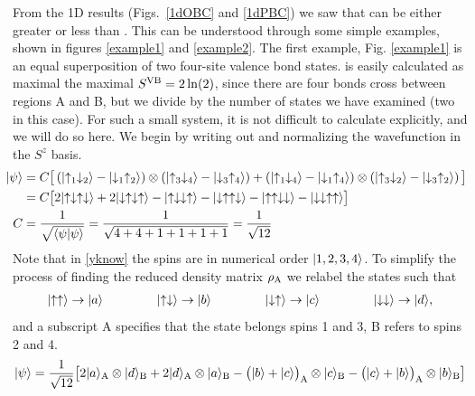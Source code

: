 From the 1D results (Figs.~\ref{1dOBC} and \ref{1dPBC}) we saw that \vb can be either greater or less than \vN.
This can be understood through some simple examples, shown in figures \ref{example1} and \ref{example2}.
The first example, Fig. \ref{example1} is an equal superposition of two four-site valence bond states. 
 \vb is easily calculated as maximal the maximal $S^{\text{VB}} = 2\ln(2)$, since there are four bonds cross between regions A and B, but we divide by the number of states we have examined (two in this case).
 For such a small system, it is not difficult to calculate \vn explicitly, and we will do so here.
 We begin by writing out and normalizing the wavefunction in the $S^z$ basis.
 \begin{align}
\hspace{-2mm}
 \ket{\psi} &= C \big[ \left( \ket{\up_1\dw_2} - \ket{\dw_1\up_2}\right) \otimes 
 		\left( \ket{\up_3\dw_4} - \ket{\dw_3\up_4}\right) + 
		\left( \ket{\up_1\dw_4} - \ket{\dw_1\up_4}\right) \otimes 
 		\left( \ket{\up_3\dw_2} - \ket{\dw_3\up_2}\right) \big] \\
		&= C \big[ 2\ket{\up\dw\up\dw} + 2 \ket{\dw\up\dw\up} -
			\ket{\up\dw\dw\up} -\ket{\dw\up\up\dw} - \ket{\up\up\dw\dw} - \ket{\dw\dw\up\up}
			\big] \label{yknow}\\
C &= \frac{1}{\sqrt{\bra{\psi}\psi\rangle}} = \frac{1}{\sqrt{4+4+1+1+1+1}} = \frac{1}{\sqrt{12}}
 \end{align}
 Note that in \eqref{yknow} the spins are in numerical order $\lvert {1,2,3,4} \rangle$.
 To simplify the process of finding the reduced density matrix $\rho_{\rm A}$ we relabel the states such that
 \begin{eqnarray}
 \ket{\up\up} \rightarrow \ket{a} \hspace{15mm} \ket{\up\dw} \rightarrow \ket{b}  \hspace{15mm} 
 \ket{\dw\up} \rightarrow \ket{c}  \hspace{15mm} \ket{\dw\dw} \rightarrow \ket{d},
 \end{eqnarray}
and a subscript A specifies that the state belongs spins 1 and 3, B refers to spins 2 and 4. 
 \begin{eqnarray}
\lvert {\psi} \rangle = \frac{1}{\sqrt{12}} \big[ 
		2\lvert {a} \rangle_{\rm A}\otimes \lvert {d} \rangle_{\rm B} + 
		2\lvert {d} \rangle_{\rm A}\otimes \lvert {a} \rangle_{\rm B} 
		- \big(\lvert {b} \rangle +\lvert {c} \rangle\big)_{\rm A} \otimes  \lvert {c} \rangle_{\rm B} 
		 -\big(\lvert {c} \rangle +\lvert {b} \rangle\big)_{\rm A} \otimes \lvert {b} \rangle_{\rm B}
		\big]
 \end{eqnarray}
